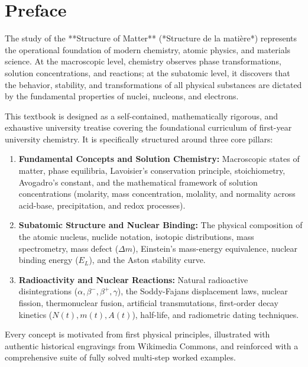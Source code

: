 \documentclass[11pt,oneside,openany]{book}
\begin{document}
\frontmatter
\pagestyle{plain}

\chapter*{Preface}

The study of the **Structure of Matter** (*Structure de la matière*) represents the operational foundation of modern chemistry, atomic physics, and materials science. At the macroscopic level, chemistry observes phase transformations, solution concentrations, and reactions; at the subatomic level, it discovers that the behavior, stability, and transformations of all physical substances are dictated by the fundamental properties of nuclei, nucleons, and electrons.

This textbook is designed as a self-contained, mathematically rigorous, and exhaustive university treatise covering the foundational curriculum of first-year university chemistry. It is specifically structured around three core pillars:
\begin{enumerate}[leftmargin=1.8em,itemsep=4pt]
  \item \textbf{Fundamental Concepts and Solution Chemistry:} Macroscopic states of matter, phase equilibria, Lavoisier's conservation principle, stoichiometry, Avogadro's constant, and the mathematical framework of solution concentrations (molarity, mass concentration, molality, and normality across acid-base, precipitation, and redox processes).
  \item \textbf{Subatomic Structure and Nuclear Binding:} The physical composition of the atomic nucleus, nuclide notation, isotopic distributions, mass spectrometry, mass defect ($\Delta m$), Einstein's mass-energy equivalence, nuclear binding energy ($E_L$), and the Aston stability curve.
  \item \textbf{Radioactivity and Nuclear Reactions:} Natural radioactive disintegrations ($\alpha, \beta^-, \beta^+, \gamma$), the Soddy-Fajans displacement laws, nuclear fission, thermonuclear fusion, artificial transmutations, first-order decay kinetics ($N(t), m(t), A(t)$), half-life, and radiometric dating techniques.
\end{enumerate}

Every concept is motivated from first physical principles, illustrated with authentic historical engravings from Wikimedia Commons, and reinforced with a comprehensive suite of fully solved multi-step worked examples.

\tableofcontents

\mainmatter
\pagestyle{fancy}





\appendix

\end{document}
